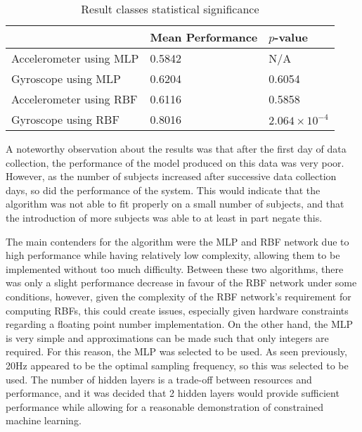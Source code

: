 \begin{table}
	\centering
	\begin{tabular}{l|ll}
		& Mean Performance & $p$-value \\
		\hline
		Accelerometer using MLP & 0.5842 & N/A \\
		Gyroscope using MLP     & 0.6204 & 0.6054 \\
		Accelerometer using RBF & 0.6116 & 0.5858 \\
		Gyroscope using RBF     & 0.8016 & $2.064 \times 10^{-4}$ \\        
	\end{tabular}
	\caption{Result classes statistical significance \label{tab:res-ttest}}
\end{table}

A noteworthy observation about the results was that after the first day of data collection, the performance of the model produced on this data was very poor. However, as the number of subjects increased after successive data collection days, so did the performance of the system. This would indicate that the algorithm was not able to fit properly on a small number of subjects, and that the introduction of more subjects was able to at least in part negate this.

The main contenders for the algorithm were the MLP and RBF network due to high performance while having relatively low complexity, allowing them to be implemented without too much difficulty. Between these two algorithms, there was only a slight performance decrease in favour of the RBF network under some conditions, however, given the complexity of the RBF network's requirement for computing RBFs, this could create issues, especially given hardware constraints regarding a floating point number implementation. On the other hand, the MLP is very simple and approximations can be made such that only integers are required. For this reason, the MLP was selected to be used. As seen previously, 20Hz appeared to be the optimal sampling frequency, so this was selected to be used. The number of hidden layers is a trade-off between resources and performance, and it was decided that 2 hidden layers would provide sufficient performance while allowing for a reasonable demonstration of constrained machine learning.

